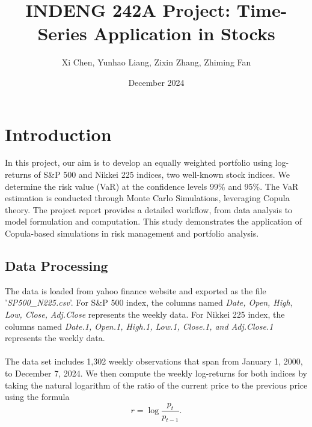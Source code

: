 \documentclass{article}
\title{INDENG 242A Project: Time-Series Application in Stocks}
\author{Xi Chen, Yunhao Liang, Zixin Zhang, Zhiming Fan}
\date{December 2024}
\begin{document}
\maketitle

\section{Introduction}
In this project, our aim is to develop an equally weighted portfolio using log-returns of S\&P 500 and Nikkei 225 indices, two well-known stock indices. We determine the risk value (VaR) at the confidence levels 99\% and 95\%.  The VaR estimation is conducted through Monte Carlo Simulations, leveraging Copula theory. 
The project report provides a detailed workflow, from data analysis to model formulation and computation. This study demonstrates the application of Copula-based simulations in risk management and portfolio analysis.

\subsection{Data Processing}
The data is loaded from yahoo finance website and exported as the file '\textit{SP500\_N225.csv}'. For S\&P 500 index, the columns named \textit{Date, Open, High, Low, Close,} \textit{Adj.Close} represents the weekly data. For Nikkei 225 index, the columns named \textit{Date.1, Open.1, High.1, Low.1, Close.1, and Adj.Close.1} represents the weekly data. \\
\\
The data set includes 1,302 weekly observations that span from January 1, 2000, to December 7, 2024. We then compute the weekly log-returns for both indices by taking the natural logarithm of the ratio of the current price to the previous price using the formula \begin{equation}
    r = \log \frac{p_t}{p_{t-1}}.
    \label{eq:log_return}
\end{equation}
\end{document}
